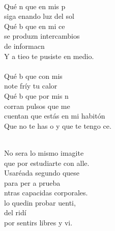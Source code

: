 \begin{cancion}%
\jump
	    \chord{(}{**)}{    }\\
	Qué n que en mis p \\
	siga enando luz del sol\\
	Qué b que en mi ce\\
	se produzn intercambios \\
	de informacn\\
	Y a tieo te pusiste en medio.\\
\jump
	   \chord{(}{**)}{    }\\
	Qué b que con mis \\
	note fríy tu calor \\
	Qué b que por mis n \\
	corran pulsos que me\\
	cuentan que estás en mi habitón\\
	Que no te has o y que te tengo ce.\\\jump\\
	\begin{chorus}%
	No sera lo mismo imagite\\
	que por estudiarte con alle.\\
	Usaréada segundo quese\\
	para per a prueba \\
	ntras capacidas corporales.\\
\jump
	lo quedin probar uenti,\\
	del ridí\\
	por sentirs libres y vi.\\
	\end{chorus}%
	\jump\\
	   \\

\end{cancion}
